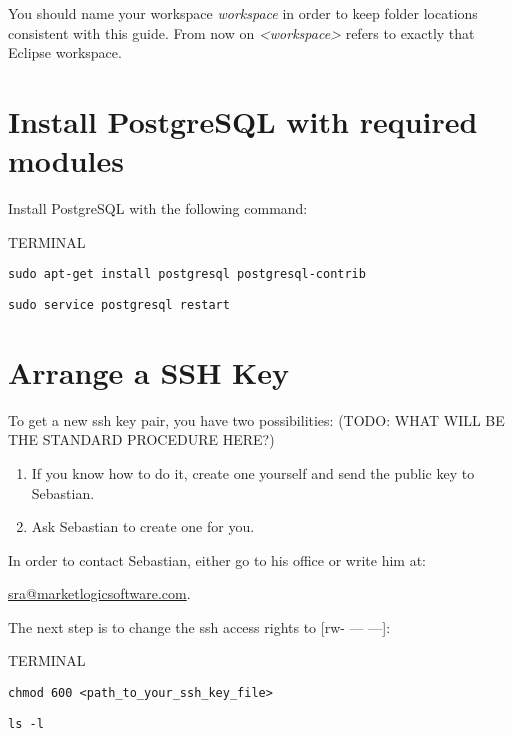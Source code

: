 \documentclass[10pt,a4paper]{article}
\begin{document}
\vspace{\baselineskip}
\tip{}You should name your workspace \textit{workspace} in order to keep folder locations consistent with this guide. From now on \textit{<workspace>} refers to exactly that Eclipse workspace. 


\newpage
\section{Install PostgreSQL with required modules}
Install PostgreSQL with the following command:

\begin{command}{TERMINAL}
\begin{lstlisting}
sudo apt-get install postgresql postgresql-contrib
\end{lstlisting}

\noindent
{}
\begin{lstlisting}
sudo service postgresql restart
\end{lstlisting}
\end{command}

\newpage
\section{Arrange a SSH Key}
To get a new ssh key pair, you have two possibilities: (TODO: WHAT WILL BE THE STANDARD PROCEDURE HERE?)
\begin{enumerate}
\item{} If you know how to do it, create one yourself and send the public key to Sebastian.
\item{} Ask Sebastian to create one for you.
\end{enumerate}

\tip{}In order to contact Sebastian, either go to his office or write him at: \newline
\begin{center}
\href{mailto:sra@marketlogicsoftware.com}{sra@marketlogicsoftware.com}.
\end{center}

\vspace{\baselineskip}
\noindent
The next step is to change the ssh access rights to [rw- --- ---]:

\begin{command}{TERMINAL}
\begin{lstlisting}
chmod 600 <path_to_your_ssh_key_file>
\end{lstlisting}

\noindent
{}
\begin{lstlisting}
ls -l
\end{lstlisting}

\end{command}
\end{document}
